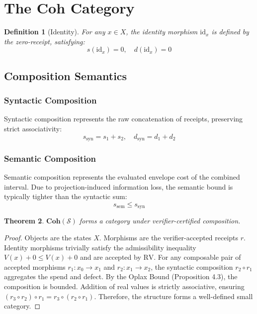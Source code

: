 \documentclass[11pt]{article}
\newtheorem{theorem}{Theorem}[section]
\newtheorem{definition}[theorem]{Definition}
\begin{document}
\section{The Coh Category}

\begin{definition}[Identity]
For any $x \in X$, the identity morphism $\mathrm{id}_x$ is defined by the zero-receipt, satisfying:
\[
s(\mathrm{id}_x)=0,\quad d(\mathrm{id}_x)=0
\]
\end{definition}

\subsection{Composition Semantics}

\subsubsection{Syntactic Composition}
Syntactic composition represents the raw concatenation of receipts, preserving strict associativity:
\[
s_{\mathrm{syn}} = s_1 + s_2, \quad d_{\mathrm{syn}} = d_1 + d_2
\]

\subsubsection{Semantic Composition}
Semantic composition represents the evaluated envelope cost of the combined interval. Due to projection-induced information loss, the semantic bound is typically tighter than the syntactic sum:
\[
s_{\mathrm{sem}} \le s_{\mathrm{syn}}
\]

\begin{theorem}
$\mathbf{Coh}(\mathcal{S})$ forms a category under verifier-certified composition.
\end{theorem}
\begin{proof}
Objects are the states $X$. Morphisms are the verifier-accepted receipts $r$. Identity morphisms trivially satisfy the admissibility inequality $V(x) + 0 \le V(x) + 0$ and are accepted by $\mathrm{RV}$. For any composable pair of accepted morphisms $r_1: x_0 \to x_1$ and $r_2: x_1 \to x_2$, the syntactic composition $r_2 \circ r_1$ aggregates the spend and defect. By the Oplax Bound (Proposition 4.3), the composition is bounded. Addition of real values is strictly associative, ensuring $(r_3 \circ r_2) \circ r_1 = r_3 \circ (r_2 \circ r_1)$. Therefore, the structure forms a well-defined small category.
\end{proof}
\end{document}

